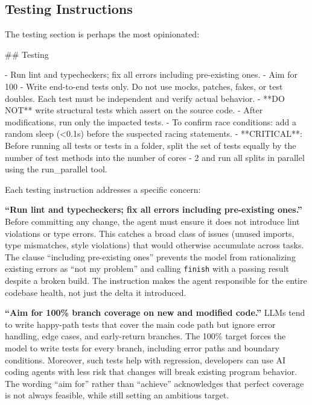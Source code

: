 \documentclass{article}
\begin{document}
\subsection{Testing Instructions}

The testing section is perhaps the most opinionated:

\begin{prompt}
## Testing

- Run lint and typecheckers; fix all errors including
  pre-existing ones.
- Aim for 100%
- Write end-to-end tests only. Do not use mocks,
  patches, fakes, or test doubles. Each test must be
  independent and verify actual behavior.
- **DO NOT** write structural tests which assert on
  the source code.
- After modifications, run only the impacted tests.
- To confirm race conditions: add a random sleep (<0.1s)
  before the suspected racing statements.
- **CRITICAL**: Before running all tests or tests in
  a folder, split the set of tests equally by the
  number of test methods into the number of cores - 2
  and run all splits in parallel using the run_parallel
  tool.
\end{prompt}

\noindent Each testing instruction addresses a specific concern:

\textbf{``Run lint and typecheckers; fix all errors including pre-existing ones.''}  Before committing any change, the agent must ensure it does not introduce lint violations or type errors.  This catches a broad class of issues (unused imports, type mismatches, style violations) that would otherwise accumulate across tasks.  The clause ``including pre-existing ones'' prevents the model from rationalizing existing errors as ``not my problem'' and calling \texttt{finish} with a passing result despite a broken build.  The instruction makes the agent responsible for the entire codebase health, not just the delta it introduced.

\textbf{``Aim for 100\% branch coverage on new and modified code.''}  LLMs tend to write happy-path tests that cover the main code path but ignore error handling, edge cases, and early-return branches.  The 100\% target forces the model to write tests for every branch, including error paths and boundary conditions.  Moreover, such tests help with regression, developers can use AI coding agents with less risk that changes will break existing program behavior.  The wording ``aim for'' rather than ``achieve'' acknowledges that perfect coverage is not always feasible, while still setting an ambitious target.
\end{document}
